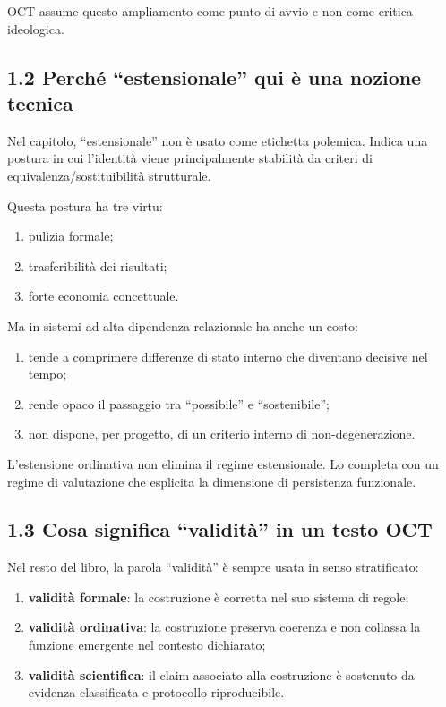 OCT assume questo ampliamento come punto di avvio e non come critica ideologica.

\subsection{1.2 Perché ``estensionale'' qui è una nozione tecnica}

Nel capitolo, ``estensionale'' non è usato come etichetta polemica. Indica una postura in cui l'identità viene principalmente stabilità da criteri di equivalenza/sostituibilità strutturale.

Questa postura ha tre virtu:

\begin{enumerate}
\def\labelenumi{\arabic{enumi}.}
\tightlist
\item
  pulizia formale;
\item
  trasferibilità dei risultati;
\item
  forte economia concettuale.
\end{enumerate}

Ma in sistemi ad alta dipendenza relazionale ha anche un costo:

\begin{enumerate}
\def\labelenumi{\arabic{enumi}.}
\tightlist
\item
  tende a comprimere differenze di stato interno che diventano decisive nel tempo;
\item
  rende opaco il passaggio tra ``possibile'' e ``sostenibile'';
\item
  non dispone, per progetto, di un criterio interno di non-degenerazione.
\end{enumerate}

L'estensione ordinativa non elimina il regime estensionale. Lo completa con un regime di valutazione che esplicita la dimensione di persistenza funzionale.

\subsection{1.3 Cosa significa ``validità'' in un testo OCT}

Nel resto del libro, la parola ``validità'' è sempre usata in senso stratificato:

\begin{enumerate}
\def\labelenumi{\arabic{enumi}.}
\tightlist
\item
  \textbf{validità formale}: la costruzione è corretta nel suo sistema di regole;
\item
  \textbf{validità ordinativa}: la costruzione preserva coerenza e non collassa la funzione emergente nel contesto dichiarato;
\item
  \textbf{validità scientifica}: il claim associato alla costruzione è sostenuto da evidenza classificata e protocollo riproducibile.
\end{enumerate}

